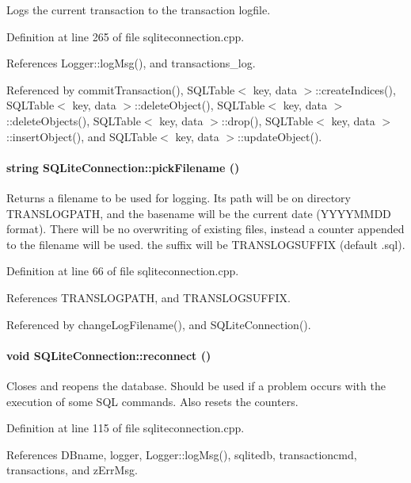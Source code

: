 Logs the current transaction to the transaction logfile. 

Definition at line 265 of file sqliteconnection.cpp.

References Logger::log\-Msg(), and transactions\_\-log.

Referenced by commit\-Transaction(), SQLTable$<$ key, data $>$::create\-Indices(), SQLTable$<$ key, data $>$::delete\-Object(), SQLTable$<$ key, data $>$::delete\-Objects(), SQLTable$<$ key, data $>$::drop(), SQLTable$<$ key, data $>$::insert\-Object(), and SQLTable$<$ key, data $>$::update\-Object().\hypertarget{classSQLiteConnection_SQLiteConnectiona15}{
\paragraph[pickFilename]{\setlength{\rightskip}{0pt plus 5cm}string SQLite\-Connection::pick\-Filename ()}\hfill}
\label{classSQLiteConnection_SQLiteConnectiona15}


Returns a filename to be used for logging. Its path will be on directory TRANSLOGPATH, and the basename will be the current date (YYYYMMDD format). There will be no overwriting of existing files, instead a counter appended to the filename will be used. the suffix will be TRANSLOGSUFFIX (default .sql). 

Definition at line 66 of file sqliteconnection.cpp.

References TRANSLOGPATH, and TRANSLOGSUFFIX.

Referenced by change\-Log\-Filename(), and SQLite\-Connection().\hypertarget{classSQLiteConnection_SQLiteConnectiona5}{
\paragraph[reconnect]{\setlength{\rightskip}{0pt plus 5cm}void SQLite\-Connection::reconnect ()}\hfill}
\label{classSQLiteConnection_SQLiteConnectiona5}


Closes and reopens the database. Should be used if a problem occurs with the execution of some SQL commands. Also resets the counters. 

Definition at line 115 of file sqliteconnection.cpp.

References DBname, logger, Logger::log\-Msg(), sqlitedb, transactioncmd, transactions, and z\-Err\-Msg.

